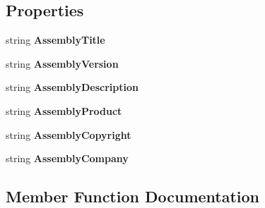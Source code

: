 \subsection*{Properties}
\begin{DoxyCompactItemize}
\item 
\mbox{\label{class_graph_1_1_about_box1_a975e47f83f7c0a14be043a0c3db7eb83}} 
string {\bfseries Assembly\+Title}
\item 
\mbox{\label{class_graph_1_1_about_box1_a85ea56ecca02a69659dfd98edede7d67}} 
string {\bfseries Assembly\+Version}
\item 
\mbox{\label{class_graph_1_1_about_box1_adca7c6ee8aec9435114a199409831e30}} 
string {\bfseries Assembly\+Description}
\item 
\mbox{\label{class_graph_1_1_about_box1_a4c4fe84609ba9d173e6f76867ca153cf}} 
string {\bfseries Assembly\+Product}
\item 
\mbox{\label{class_graph_1_1_about_box1_a729d1d2155be35569340f38121c71a8c}} 
string {\bfseries Assembly\+Copyright}
\item 
\mbox{\label{class_graph_1_1_about_box1_a79dc9db943a090256db6f5ce96830332}} 
string {\bfseries Assembly\+Company}
\end{DoxyCompactItemize}


\subsection{Member Function Documentation}
\mbox{\label{class_graph_1_1_about_box1_a972150c43ff56c63ca2172f781c56ec9}} 
